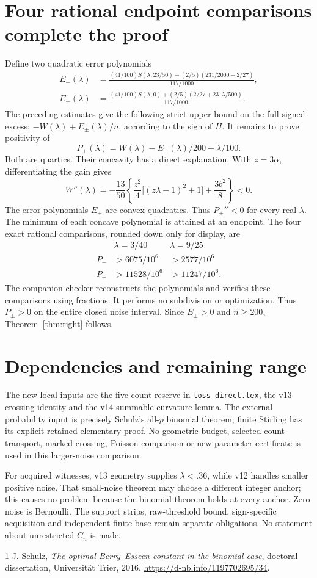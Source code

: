 \documentclass[11pt]{article}
\begin{document}
\section{Four rational endpoint comparisons complete the proof}
Define two quadratic error polynomials
\begin{align*}
 E_-(\lambda)&=\frac{(41/100)S(\lambda,23/50)
 +(2/5)(231/2000+2/27)}{117/1000},\\
 E_+(\lambda)&=\frac{(41/100)S(\lambda,0)
 +(2/5)(2/27+231\lambda/500)}{117/1000}.
\end{align*}
The preceding estimates give the following strict upper bound on the full signed excess:
$-W(\lambda)+E_\pm(\lambda)/n$, according to the sign of $H$.
It remains to prove positivity of
\[
 P_\pm(\lambda)=W(\lambda)-E_\pm(\lambda)/200-\lambda/100.
\]
Both are quartics. Their concavity has a direct explanation. With
$z=3\alpha$, differentiating the gain gives
\[
 W''(\lambda)=-\frac{13}{50}
 \left\{\frac{z^2}{4}\bigl[(z\lambda-1)^2+1\bigr]
                    +\frac{3b^2}{8}\right\}<0.
\]
The error polynomials $E_\pm$ are convex quadratics. Thus $P_\pm''<0$
for every real $\lambda$.
The minimum of each concave polynomial is attained at an endpoint.
The four exact rational comparisons, rounded down only for display, are
\[
\begin{array}{c|cc}
 &\lambda=3/40&\lambda=9/25\\\hline
P_-&>6075/10^6&>2577/10^6\\
P_+&>11528/10^6&>11247/10^6.
\end{array}
\]
The companion checker reconstructs the polynomials and verifies these
comparisons using fractions. It performs no subdivision or optimization.
Thus $P_\pm>0$ on the entire closed noise interval. Since $E_\pm>0$
and $n\ge200$, Theorem~\ref{thm:right} follows.

\section*{Dependencies and remaining range}
The new local inputs are the five-count reserve in \texttt{loss-direct.tex},
the v13 crossing identity and the v14 summable-curvature lemma. The external
probability input is precisely Schulz's all-$p$ binomial theorem; finite
Stirling has its explicit retained elementary proof. No geometric-budget,
selected-count transport, marked crossing, Poisson comparison or new
parameter certificate is used in this larger-noise comparison.

For acquired witnesses, v13 geometry supplies $\lambda<.36$, while v12
handles smaller positive noise. That small-noise theorem may choose a
different integer anchor; this causes no problem because the binomial
theorem holds at every anchor. Zero noise is Bernoulli. The support strips,
raw-threshold bound, sign-specific acquisition and independent finite base
remain separate obligations. No statement about unrestricted $C_n$ is made.

\begin{thebibliography}{1}
J. Schulz,
\emph{The optimal Berry--Esseen constant in the binomial case},
doctoral dissertation, Universit\"at Trier, 2016.
\url{https://d-nb.info/1197702695/34}.
\end{thebibliography}
\end{document}
